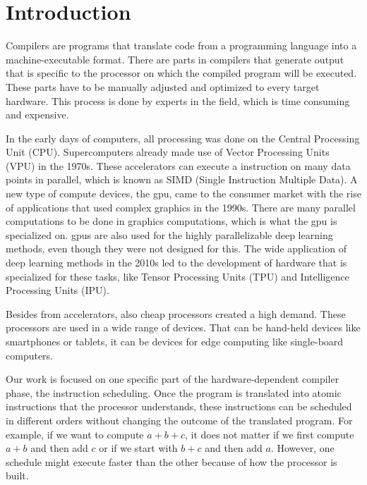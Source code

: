 \chapter{Introduction}
Compilers are programs that translate code from a programming language into a machine-executable format.
There are parts in compilers that generate output that is specific to the processor on which the compiled program will be executed.
These parts have to be manually adjusted and optimized to every target hardware.
This process is done by experts in the field, which is time consuming and expensive.

In the early days of computers, all processing was done on the Central Processing Unit (CPU).
Supercomputers already made use of Vector Processing Units (VPU) in the 1970s.
These accelerators can execute a instruction on many data points in parallel, which is known as SIMD (Single Instruction Multiple Data).
A new type of compute devices, the \ac{gpu}, came to the consumer market with the rise of applications that used complex graphics in the 1990s.
There are many parallel computations to be done in graphics computations, which is what the \ac{gpu} is specialized on.
\acp{gpu} are also used for the highly parallelizable deep learning methods, even though they were not designed for this.
The wide application of deep learning methods in the 2010s led to the development of hardware that is specialized for these tasks, like Tensor Processing Units (TPU) and Intelligence Processing Units (IPU).

Besides from accelerators, also cheap processors created a high demand.
These processors are used in a wide range of devices.
That can be hand-held devices like smartphones or tablets, it can be devices for edge computing like single-board computers.

Our work is focused on one specific part of the hardware-dependent compiler phase, the instruction scheduling.
Once the program is translated into atomic instructions that the processor understands, these instructions can be scheduled in different orders without changing the outcome of the translated program.
For example, if we want to compute $a+b+c$, it does not matter if we first compute $a+b$ and then add $c$ or if we start with $b+c$ and then add $a$.
However, one schedule might execute faster than the other because of how the processor is built.

